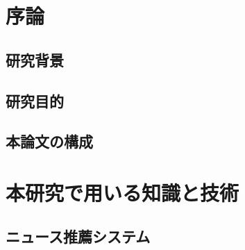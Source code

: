 \documentclass[12pt,a4j]{jreport}
\begin{document}



\chapter{序論}

\section{研究背景}


\section{研究目的}


\section{本論文の構成}


\chapter{本研究で用いる知識と技術}

\section{ニュース推薦システム}
\end{document}
